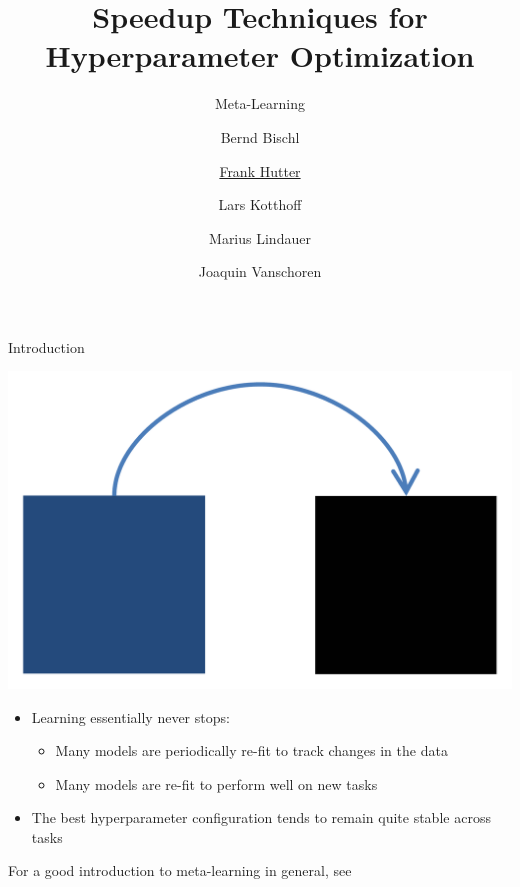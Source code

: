 

\title{Speedup Techniques for Hyperparameter Optimization}
\subtitle{Meta-Learning}
\author[Frank Hutter]{Bernd Bischl \and \underline{Frank Hutter} \and Lars Kotthoff\newline \and Marius Lindauer \and Joaquin Vanschoren}
\institute{}
\date{}




\maketitle


\begin{frame}[c]{Introduction}

	\begin{center}
		\includegraphics[width=0.2\linewidth, keepaspectratio=true]{images/intro/meta-learning.png}
	\end{center}
				
	\begin{itemize}
		\item Learning essentially never stops:
		\begin{itemize}
			\item Many models are periodically re-fit to track changes in the data
			\item Many models are re-fit to perform well on new tasks
		\end{itemize}
		\item The best hyperparameter configuration tends to remain quite stable across tasks
	\end{itemize}
	\bigskip
	\bigskip
	\bigskip
\pause
	\begin{center}
	For a good introduction to meta-learning in general, see 
	\end{center}			
\end{frame}

